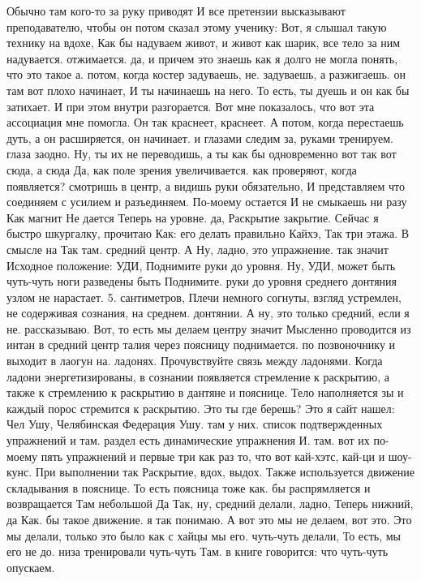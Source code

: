 Обычно там кого-то за руку приводят И все претензии высказывают преподавателю, чтобы он потом сказал этому ученику: Вот, я слышал такую технику на вдохе, Как бы надуваем живот, и живот как шарик, все тело за ним надувается.
отжимается. да, и причем это знаешь как я долго не могла понять, что это такое а.
потом, когда костер задуваешь, не.
задуваешь, а разжигаешь. он там вот плохо начинает, И ты начинаешь на него.
То есть, ты дуешь и он как бы затихает.
И при этом внутри разгорается. Вот мне показалось, что вот эта ассоциация мне помогла.
Он так краснеет, краснеет.
А потом, когда перестаешь дуть, а он расширяется, он начинает.
и глазами следим за, руками тренируем.
глаза заодно. Ну, ты их не переводишь, а ты как бы одновременно вот так вот сюда, а сюда Да, как поле зрения увеличивается.
как проверяют, когда появляется?
смотришь в центр, а видишь руки обязательно, И представляем что соединяем с усилием и разъединяем.
По-моему остается И не смыкаешь ни разу Как магнит Не дается Теперь на уровне.
да, Раскрытие закрытие. Сейчас я быстро шкургалку, прочитаю Как:
его делать правильно Кайхэ, Так три этажа.
В смысле на Так там.
средний центр. А Ну, ладно, это упражнение. так значит Исходное положение: УДИ, Поднимите руки до уровня. Ну, УДИ, может быть чуть-чуть ноги разведены быть Поднимите.
руки до уровня среднего донтяния узлом не нарастает. 5.
сантиметров, Плечи немного согнуты, взгляд устремлен, не содерживая сознания, на среднем.
донтянии. А ну, это только средний, если я не.
рассказываю. Вот, то есть мы делаем центру значит Мысленно проводится из интан в средний центр талия через поясницу поднимается.
по позвоночнику и выходит в лаогун на.
ладонях. Прочувствуйте связь между ладонями. Когда ладони энергетизированы, в сознании появляется стремление к раскрытию, а также к стремлению к раскрытию в дантяне и пояснице.
Тело наполняется зы и каждый порос стремится к раскрытию. Это ты где берешь?
Это я сайт нашел: Чел Ушу, Челябинская Федерация Ушу.
там у них.
список подтвержденных упражнений и там.
раздел есть динамические упражнения И.
там. вот их по-моему пять упражнений и первые три как раз то, что вот кай-хэтс, кай-ци и шоу-кунс. При выполнении так Раскрытие, вдох, выдох. Также используется движение складывания в пояснице.
То есть поясница тоже как.
бы распрямляется и возвращается Там небольшой Да Так, ну, средний делали, ладно, Теперь нижний, да Как.
бы такое движение. я так понимаю. А вот это мы не делаем, вот это.
Это мы делали, только это было как с хайцы мы его.
чуть-чуть делали, То есть, мы его не до.
низа тренировали чуть-чуть Там.
в книге говорится:
что чуть-чуть опускаем.
